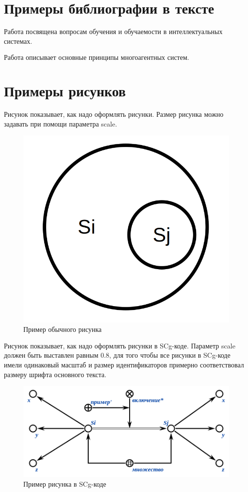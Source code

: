 
\section*{Примеры библиографии в тексте}

Работа  посвящена вопросам обучения и обучаемости в интеллектуальных системах.

Работа  описывает основные принципы многоагентных систем.

\section*{Примеры рисунков}

Рисунок \textit{} показывает, как надо оформлять рисунки. Размер рисунка можно задавать при помощи параметра scale.

\begin{figure}[H]
	\includegraphics[scale=0.5]{images/fig_example.png}
	\caption{Пример обычного рисунка}
	\label{fig:example}
\end{figure}

Рисунок \textit{} показывает, как надо оформлять рисунки в SCg-коде. Параметр scale должен быть выставлен равным 0.8, для того чтобы все рисунки в SCg-коде имели одинаковый масштаб и размер идентификаторов примерно соответствовал размеру шрифта основного текста.  

\begin{figure}[H]
	\includegraphics[scale=0.8]{images/fig_example_scg.png}
	\caption{Пример рисунка в SCg-коде}
	\label{fig:example_scg}
\end{figure}
